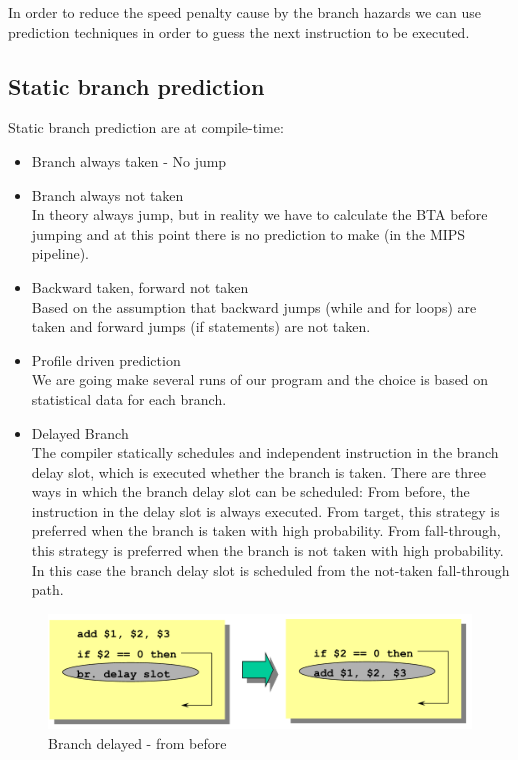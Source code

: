 In order to reduce the speed penalty cause by the branch hazards we can use prediction techniques in order to guess
the next instruction to be executed.

\subsection{Static branch prediction}\label{subsec:static-branch-prediction}
Static branch prediction are at compile-time:
\begin{itemize}
    \item Branch always taken - No jump
    \item Branch always not taken\\ In theory always jump, but in reality we have to calculate the BTA before jumping
    and at this point there is no prediction to make (in the MIPS pipeline).
    \item Backward taken, forward not taken\\
    Based on the assumption that backward jumps (while and for loops) are taken and forward jumps (if statements) are
    not taken.
    \item Profile driven prediction\\
    We are going make several runs of our program and the choice is based on statistical data for each branch.
    \item Delayed Branch\\
    The compiler statically schedules and independent instruction in the branch delay slot, which is executed whether
    the branch is taken.
    There are three ways in which the branch delay slot can be scheduled:
        \subitem From before, the instruction in the delay slot is always executed.
        \subitem From target, this strategy is preferred when the branch is taken with high probability.
        \subitem From fall-through, this strategy is preferred when the branch is not taken with high probability. In
    this case the branch delay slot is scheduled from the not-taken fall-through path.
\end{itemize}

\begin{figure}[h]
    \centering
    \includegraphics[scale = 0.4]{images/branch-delayed-from-before}
    \caption{Branch delayed - from before}
    \label{fig:branch-delayed-from-before}
\end{figure}

